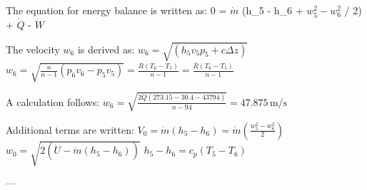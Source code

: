 The equation for energy balance is written as:  
0 = \( \dot{m} \) (h_5 - h_6 + \( w_5^2 - w_6^2 \) / 2) + \( \dot{Q} \) - \( \dot{W} \)

The velocity \( w_6 \) is derived as:  
\( w_6 = \sqrt{(h_5 v_5 p_5 + c \Delta z)} \)  
\( w_6 = \sqrt{\frac{n}{n-1} (p_6 v_6 - p_5 v_5)} = \frac{R (T_6 - T_5)}{n - 1} = \frac{\bar{R} (T_6 - T_5)}{n - 1} \)

A calculation follows:  
\( w_6 = \sqrt{\frac{2 \dot{Q} (273.15 - 30.4 - 43794)}{n - 94}} = 47.875 \, \text{m/s} \)

Additional terms are written:  
\( V_0 = \dot{m} (h_5 - h_6) = \dot{m} (\frac{w_5^2 - w_6^2}{2}) \)  
\( w_0 = \sqrt{2 (\dot{U} - \dot{m} (h_5 - h_6))} \)  
\( h_5 - h_6 = c_p (T_5 - T_6) \)

---